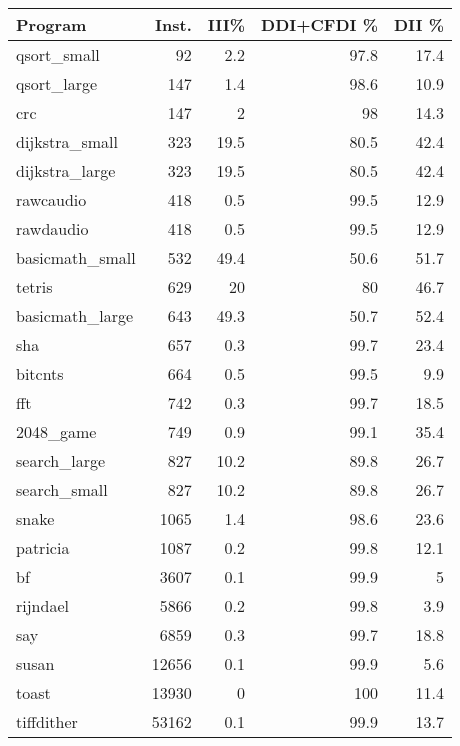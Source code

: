 \begin{tabular}{lrrrr}
\hline
 Program         &   Inst. &   III\% &   DDI+CFDI \% &   DII \% \\
\hline
 qsort\_small     &      92 &    2.2 &         97.8 &    17.4 \\
 qsort\_large     &     147 &    1.4 &         98.6 &    10.9 \\
 crc             &     147 &    2   &         98   &    14.3 \\
 dijkstra\_small  &     323 &   19.5 &         80.5 &    42.4 \\
 dijkstra\_large  &     323 &   19.5 &         80.5 &    42.4 \\
 rawcaudio       &     418 &    0.5 &         99.5 &    12.9 \\
 rawdaudio       &     418 &    0.5 &         99.5 &    12.9 \\
 basicmath\_small &     532 &   49.4 &         50.6 &    51.7 \\
 tetris          &     629 &   20   &         80   &    46.7 \\
 basicmath\_large &     643 &   49.3 &         50.7 &    52.4 \\
 sha             &     657 &    0.3 &         99.7 &    23.4 \\
 bitcnts         &     664 &    0.5 &         99.5 &     9.9 \\
 fft             &     742 &    0.3 &         99.7 &    18.5 \\
 2048\_game       &     749 &    0.9 &         99.1 &    35.4 \\
 search\_large    &     827 &   10.2 &         89.8 &    26.7 \\
 search\_small    &     827 &   10.2 &         89.8 &    26.7 \\
 snake           &    1065 &    1.4 &         98.6 &    23.6 \\
 patricia        &    1087 &    0.2 &         99.8 &    12.1 \\
 bf              &    3607 &    0.1 &         99.9 &     5   \\
 rijndael        &    5866 &    0.2 &         99.8 &     3.9 \\
 say             &    6859 &    0.3 &         99.7 &    18.8 \\
 susan           &   12656 &    0.1 &         99.9 &     5.6 \\
 toast           &   13930 &    0   &        100   &    11.4 \\
 tiffdither      &   53162 &    0.1 &         99.9 &    13.7 \\

\end{tabular}
